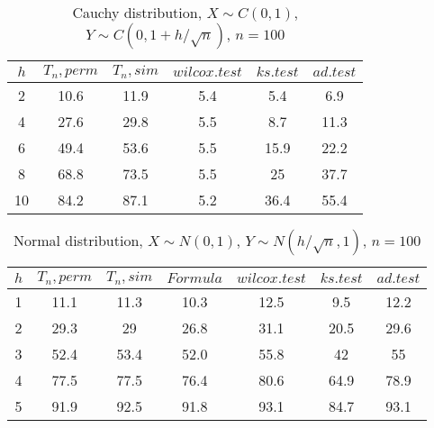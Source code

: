 \documentclass[slidestop,usepdftitle=false]{beamer}
\begin{document}
\begin{slide}
\begin{table}
  \caption{Cauchy distribution, $X\sim C(0,1)$, $Y\sim C(0, 1 + h/\sqrt{n})$, $n=100$}
  \begin{center}
  \begin{tabular}{c@{\quad}c@{\quad}c@{\quad}c@{\quad}c@{\quad}c}
  \hline
  $h$ & $T_n, perm$ & $T_n, sim$ & $wilcox.test$ & $ks.test$ & $ad.test$ \\
  \hline
  2 & 10.6 & 11.9 & 5.4 & 5.4 & 6.9 \\
  4 & 27.6 & 29.8 & 5.5 & 8.7 & 11.3 \\
  6 & 49.4 & 53.6 & 5.5 & 15.9 & 22.2 \\
  8 & 68.8 & 73.5 & 5.5 & 25 & 37.7 \\
  10 & 84.2 & 87.1 & 5.2 & 36.4 & 55.4 \\
  \hline
  \end{tabular}
  \end{center}
\end{table}
\end{slide}

\begin{slide}
\begin{table}
  \caption{Normal distribution, $X\sim N(0,1)$, $Y\sim N(h/\sqrt{n},1)$, $n=100$}
  \begin{center}
  \begin{tabular}{c@{\quad}c@{\quad}c@{\quad}c@{\quad}c@{\quad}c@{\quad}c}
  \hline
  $h$ & $T_n, perm$ & $T_n, sim$ & $Formula$ & $wilcox.test$ & $ks.test$ & $ad.test$ \\
  \hline
  1 & 11.1 & 11.3 & 10.3 & 12.5 & 9.5 & 12.2 \\
  2 & 29.3 & 29 & 26.8 & 31.1 & 20.5 & 29.6 \\
  3 & 52.4 & 53.4 & 52.0 & 55.8 & 42 & 55 \\
  4 & 77.5 & 77.5 & 76.4 & 80.6 & 64.9 & 78.9 \\
  5 & 91.9 & 92.5 & 91.8 & 93.1 & 84.7 & 93.1 \\
  \hline
  \end{tabular}
  \end{center}
\end{table}
\end{slide}
\end{document}
